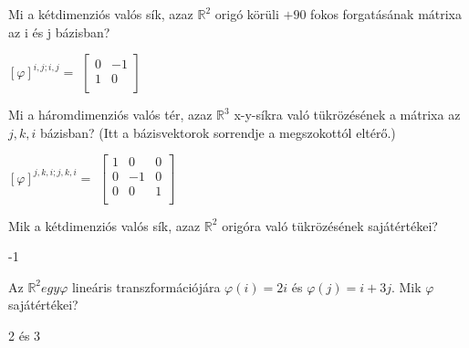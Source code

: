 \begin{frame}
  \begin{tcolorbox}[title={9/1. {\symknight}}]
    Mi a kétdimenziós valós sík, azaz $\mathbb{R}^2$ origó körüli $+90$ fokos forgatásának mátrixa az i és j bázisban?

  \tcblower

    \mmedskip 
    
    $[{\varphi}]^{i,j;i,j} =$ $\begin{bmatrix} 
  				0 & -1 \\
  				1 & 0 \\
			\end{bmatrix}$
  \end{tcolorbox}
\end{frame}


\begin{frame}
  \begin{tcolorbox}[title={9/2. {\symrook}}]
    Mi a háromdimenziós valós tér, azaz $\mathbb{R}^3$ x-y-síkra való tükrözésének a mátrixa az $j,k,i$ bázisban? (Itt a bázisvektorok sorrendje a megszokottól eltérő.)

  \tcblower

    \mmedskip 
    
     $[{\varphi}]^{j,k,i;j,k,i} = $ $\begin{bmatrix} 
  				1 & 0 & 0 \\
  				0 & -1 & 0 \\
  				0 & 0 & 1 \\
			\end{bmatrix}$
  \end{tcolorbox}
\end{frame}


\begin{frame}
  \begin{tcolorbox}[title={9/3. {\symknight}}]
    Mik a kétdimenziós valós sík, azaz $\mathbb{R}^2$ origóra való tükrözésének sajátértékei?

  \tcblower

    \mmedskip 
    
    -1
  \end{tcolorbox}
\end{frame}


\begin{frame}
  \begin{tcolorbox}[title={9/4. {\symrook}}]
    Az $\mathbb{R}^2 egy {\varphi}$ lineáris transzformációjára ${\varphi}(i) = 2i$ és ${\varphi}(j) = i + 3j$. Mik ${\varphi}$ sajátértékei? 
    
  \tcblower

    \mmedskip 
    
     2 és 3
  \end{tcolorbox}
\end{frame}


